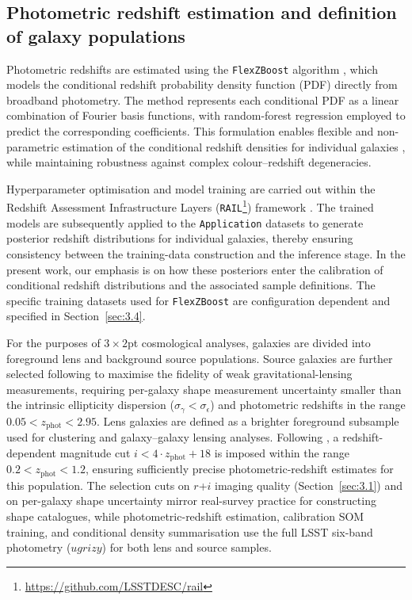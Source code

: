 \subsection{Photometric redshift estimation and definition of galaxy populations} \label{sec:3.2}

Photometric redshifts are estimated using the \texttt{FlexZBoost} algorithm \citep{2020A&C....3000362D}, which models the conditional redshift probability density function (PDF) directly from broadband photometry. The method represents each conditional PDF as a linear combination of Fourier basis functions, with random-forest regression employed to predict the corresponding coefficients. This formulation enables flexible and non-parametric estimation of the conditional redshift densities for individual galaxies \citep{10.1214/17-EJS1302}, while maintaining robustness against complex colour--redshift degeneracies.

Hyperparameter optimisation and model training are carried out within the Redshift Assessment Infrastructure Layers (\texttt{RAIL}\footnote{\url{https://github.com/LSSTDESC/rail}}) framework \citep{2025arXiv250502928T}. The trained models are subsequently applied to the \texttt{Application} datasets to generate posterior redshift distributions for individual galaxies, thereby ensuring consistency between the training-data construction and the inference stage. In the present work, our emphasis is on how these posteriors enter the calibration of conditional redshift distributions and the associated sample definitions. The specific training datasets used for \texttt{FlexZBoost} are configuration dependent and specified in Section~\ref{sec:3.4}.

For the purposes of \(3\times2\)pt cosmological analyses, galaxies are divided into foreground lens and background source populations. Source galaxies are further selected following \citet{2013MNRAS.434.2121C} to maximise the fidelity of weak gravitational-lensing measurements, requiring per-galaxy shape measurement uncertainty smaller than the intrinsic ellipticity dispersion (\(\sigma_\gamma < \sigma_\epsilon\)) and photometric redshifts in the range \(0.05 < z_{\text{phot}} < 2.95\). Lens galaxies are defined as a brighter foreground subsample used for clustering and galaxy--galaxy lensing analyses. Following \citet{2021PhRvD.103d3503P}, a redshift-dependent magnitude cut \(i < 4 \cdot z_{\text{phot}} + 18\) is imposed within the range \(0.2 < z_{\text{phot}} < 1.2\), ensuring sufficiently precise photometric-redshift estimates for this population. The selection cuts on \(r\)+\(i\) imaging quality (Section~\ref{sec:3.1}) and on per-galaxy shape uncertainty mirror real-survey practice for constructing shape catalogues, while photometric-redshift estimation, calibration SOM training, and conditional density summarisation use the full LSST six-band photometry (\(ugrizy\)) for both lens and source samples.

